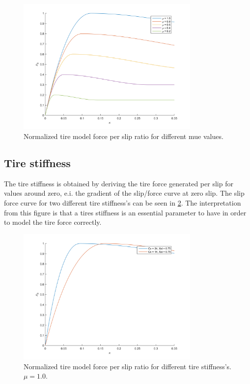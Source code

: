 \begin{figure}[h]
	\centering
	\includegraphics[width=0.8\textwidth]{Pictures/slipkraft_olika_mue}
	\caption {Normalized tire model force per slip ratio for different  mue values.}
	\label{different_mue}
\end{figure}


\subsection{Tire stiffness}

The tire stiffness is obtained by deriving the tire force generated per slip for values around zero, e.i. the gradient of the slip/force curve at zero slip. The slip force curve for two different tire stiffness's can be seen in \ref{different_cx}. The interpretation from this figure is that a tires stiffness is an essential parameter to have in order to model the tire force correctly. 

\begin{figure}[h]
	\centering
	\includegraphics[width=0.8\textwidth]{Pictures/slipkraft_olika_cx}
	\caption {Normalized tire model force per slip ratio for different tire stiffness's. $ \mu = 1.0 $.}
	\label{different_cx}
\end{figure}

